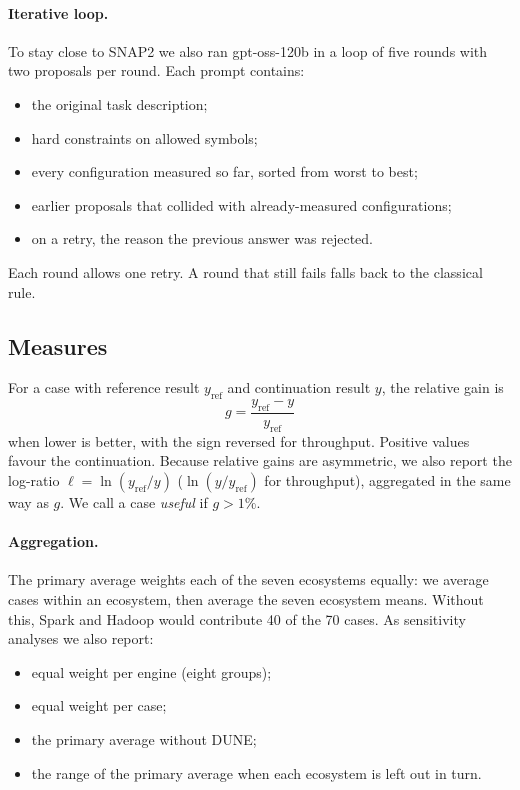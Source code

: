 \paragraph{Iterative loop.} To stay close to SNAP2 we also ran gpt-oss-120b in a loop of five rounds with two proposals per round. Each prompt contains:
\begin{itemize}
  \item the original task description;
  \item hard constraints on allowed symbols;
  \item every configuration measured so far, sorted from worst to best;
  \item earlier proposals that collided with already-measured configurations;
  \item on a retry, the reason the previous answer was rejected.
\end{itemize}
Each round allows one retry. A round that still fails falls back to the classical rule.

\subsection{Measures}

For a case with reference result $y_{\mathrm{ref}}$ and continuation result $y$, the relative gain is
\[
g = \frac{y_{\mathrm{ref}} - y}{y_{\mathrm{ref}}}
\]
when lower is better, with the sign reversed for throughput. Positive values favour the continuation. Because relative gains are asymmetric, we also report the log-ratio $\ell = \ln(y_{\mathrm{ref}}/y)$ ($\ln(y/y_{\mathrm{ref}})$ for throughput), aggregated in the same way as $g$. We call a case \emph{useful} if $g > 1\%$.

\paragraph{Aggregation.} The primary average weights each of the seven ecosystems equally: we average cases within an ecosystem, then average the seven ecosystem means. Without this, Spark and Hadoop would contribute 40 of the 70 cases. As sensitivity analyses we also report:
\begin{itemize}
  \item equal weight per engine (eight groups);
  \item equal weight per case;
  \item the primary average without DUNE;
  \item the range of the primary average when each ecosystem is left out in turn.
\end{itemize}

